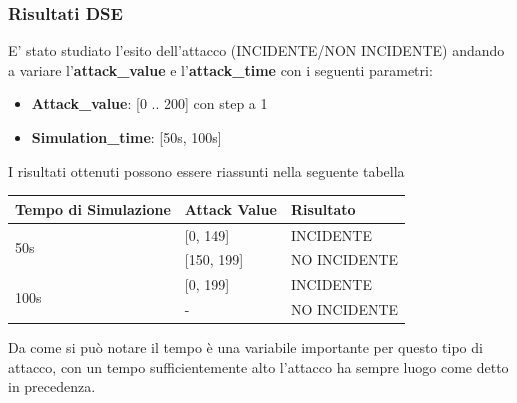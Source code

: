 \subsubsection{Risultati DSE}
E' stato studiato l'esito dell'attacco (INCIDENTE/NON INCIDENTE) andando a variare l'\textbf{attack\_value} e l'\textbf{attack\_time} con i seguenti parametri:
\begin{itemize}
	\item \textbf{Attack\_value}: [0 .. 200] con step a 1
	\item \textbf{Simulation\_time}: [50s, 100s]
\end{itemize}
 
 I risultati ottenuti possono essere riassunti nella seguente tabella
\begin{center}
	\begin{tabular}{ |p{6cm}|p{3cm}|p{4cm}|  }
		\hline
		Tempo di Simulazione& Attack Value & Risultato \\
		\hline
		\multirow{2}{4em}{50s} & [0, 149] & INCIDENTE \\
		& [150, 199] & NO INCIDENTE \\
		\hline
		\multirow{2}{4em}{100s} & [0, 199] & INCIDENTE \\
		& - & NO INCIDENTE \\
		\hline
	\end{tabular}
\end{center}
Da come si può notare il tempo è una variabile importante per questo tipo di attacco, con un tempo sufficientemente alto l'attacco ha sempre luogo come detto in precedenza.

